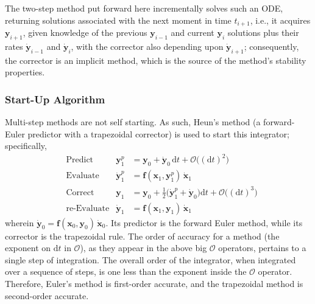 The two-step method put forward here incrementally solves such an ODE, returning solutions associated with the next moment in time $t_{i+1}$, i.e., it acquires $\mathbf{y}_{i+1}$, given knowledge of the  previous $\mathbf{y}_{i-1}$ and current $\mathbf{y}_i$ solutions plus their rates $\dot{\mathbf{y}}_{i-1}$ and $\dot{\mathbf{y}}_i$, with the corrector also depending upon $\dot{\mathbf{y}}_{i+1}$; consequently, the corrector is an implicit method, which is the source of the method's stability properties.

\subsubsection{Start-Up Algorithm}

Multi-step methods are not self starting.  As such, Heun's method (a forward-Euler predictor with a trapezoidal corrector) is used to start this integrator; specifically,
\begin{subequations}
    \label{startUp1stOrderODEs}
    \begin{align}
    \mbox{} & \text{Predict} & 
    \mathbf{y}_1^p & = \mathbf{y}_0 + \dot{\mathbf{y}}_0 \, \mathrm{d}t + 
    \mathcal{O} \bigl( (\mathrm{d}t)^2 \bigr)
    \label{startUp1stOrderPredictor} \\
    \mbox{} & \text{Evaluate} & 
    \dot{\mathbf{y}}^p_1 & = \mathbf{f} (\mathbf{x}_1 , \mathbf{y}_1^p) \, 
    \dot{\mathbf{x}}_1
    \label{startUp1stEvaluate} \\
    \mbox{} & \text{Correct} &
    \mathbf{y}_1 & = \mathbf{y}_0 + \tfrac{1}{2} 
    \bigl( \dot{\mathbf{y}}_1^p + \dot{\mathbf{y}}_0 \bigr) \mathrm{d}t + 
    \mathcal{O} \bigl( (\mathrm{d}t)^3 \bigr)
    \label{startUp1stOrderCorrector} \\
    \mbox{} & \text{re-Evaluate} & 
    \dot{\mathbf{y}}_1 & = \mathbf{f} (\mathbf{x}_1 , \mathbf{y}_1) \,
    \dot{\mathbf{x}}_1 
    \label{startUp1stReEvaluate}
    \end{align}
\end{subequations}
wherein $\dot{\mathbf{y}}_0 = \mathbf{f}(\mathbf{x}_0, \mathbf{y}_0) \, \dot{\mathbf{x}}_0$.  Its predictor is the forward Euler method, while its corrector is the trapezoidal rule.  The order of accuracy for a method (the exponent on $\mathrm{d}t$ in $\mathcal{O}$), as they appear in the above big $\mathcal{O}$ operators, pertains to a single step of integration.  The overall order of the integrator, when integrated over a sequence of steps, is one less than the exponent inside the $\mathcal{O}$ operator.  Therefore, Euler's method is first-order accurate, and the trapezoidal method is second-order accurate.


